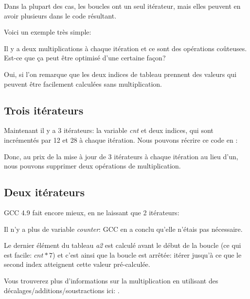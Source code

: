 ﻿
\label{loop_iterators}

Dans la plupart des cas, les boucles ont un seul itérateur, mais elles peuvent en
avoir plusieurs dans le code résultant.

Voici un exemple très simple:



Il y a deux multiplications à chaque itération et ce sont des opérations coûteuses.
Est-ce que ça peut être optimisé d'une certaine façon?

Oui, si l'on remarque que les deux indices de tableau prennent des valeurs qui peuvent
être facilement calculées sans multiplication.

\subsection{Trois itérateurs}



Maintenant il y a 3 itérateurs: la variable \emph{cnt} et deux indices, qui sont incrémentés
par 12 et 28 à chaque itération.
Nous pouvons récrire ce code en \CCpp:



Donc, au prix de la mise à jour de 3 itérateurs à chaque itération au lieu d'un,
nous pouvons supprimer deux opérations de multiplication.

\subsection{Deux itérateurs}

GCC 4.9 fait encore mieux, en ne laissant que 2 itérateurs:



Il n'y a plus de variable \emph{counter}: GCC en a conclu qu'elle n'étais pas nécessaire.

Le dernier élément du tableau \emph{a2} est calculé avant le début de la boucle (ce qui
est facile: $cnt*7$) et c'est ainsi que la boucle est arrêtée: itérer jusqu'à ce que
le second index atteignent cette valeur pré-calculée.

Vous trouverez plus d'informations sur la multiplication en utilisant des décalages/additions/soustractions
ici:
.

